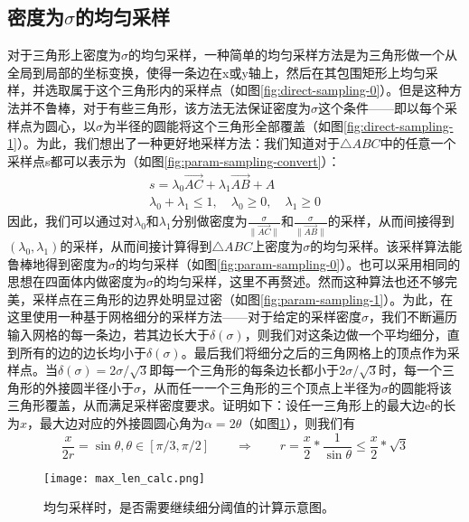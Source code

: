 \subsection{密度为$\sigma$的均匀采样}
对于三角形上密度为$\sigma$的均匀采样，一种简单的均匀采样方法是为三角形做一个从全局到局部的坐标变换，使得一条边在x或y轴上，然后在其包围矩形上均匀采样，并选取属于这个三角形内的采样点（如图\ref{fig:direct-sampling-0}）。但是这种方法并不鲁棒，对于有些三角形，该方法无法保证密度为$\sigma$这个条件——即以每个采样点为圆心，以$\sigma$为半径的圆能将这个三角形全部覆盖（如图\ref{fig:direct-sampling-1}）。为此，我们想出了一种更好地采样方法：我们知道对于$\triangle ABC$中的任意一个采样点s都可以表示为（如图\ref{fig:param-sampling-convert}）：
\begin{equation}
  \begin{split}
    s = \lambda_0 \overrightarrow{AC}+\lambda_1 \overrightarrow{AB} + A\\
    \lambda_0 + \lambda_1 \leq 1, \quad \lambda_0 \geq 0, \quad \lambda_1 \geq 0
  \end{split}
\end{equation}
因此，我们可以通过对$\lambda_0$和$\lambda_1$分别做密度为$\frac{\sigma}{\parallel \overrightarrow{AC} \parallel}$和$\frac{\sigma}{\parallel \overrightarrow{AB} \parallel}$的采样，从而间接得到$(\lambda_0,\lambda_1)$的采样，从而间接计算得到$\triangle ABC$上密度为$\sigma$的均匀采样。该采样算法能鲁棒地得到密度为$\sigma$的均匀采样（如图\ref{fig:param-sampling-0}）。也可以采用相同的思想在四面体内做密度为$\sigma$的均匀采样，这里不再赘述。然而这种算法也还不够完美，采样点在三角形的边界处明显过密（如图\ref{fig:param-sampling-1}）。为此，在这里使用一种基于网格细分的采样方法——对于给定的采样密度$\sigma$，我们不断遍历输入网格的每一条边，若其边长大于$\delta(\sigma)$，则我们对这条边做一个平均细分，直到所有的边的边长均小于$\delta(\sigma)$。最后我们将细分之后的三角网格上的顶点作为采样点。当$\delta(\sigma)=2\sigma/\sqrt{3}$即每一个三角形的每条边长都小于$2\sigma/\sqrt{3}$时，每一个三角形的外接圆半径小于$\sigma$，从而任一一个三角形的三个顶点上半径为$\sigma$的圆能将该三角形覆盖，从而满足采样密度要求。证明如下：设任一三角形上的最大边e的长为$x$，最大边对应的外接圆圆心角为$\alpha = 2\theta$（如图\ref{fig:max-len-calc}），则我们有
\begin{equation}
  \frac{x}{2r} = \sin\theta, \theta \in [\pi/3, \pi/2] \qquad
  \Rightarrow \qquad r =\frac{x}{2} * \frac{1}{\sin \theta} \leq \frac{x}{2} * \sqrt{3}
\end{equation}

\begin{figure}[htbp]
  \centering
  \texttt{[image: max\_len\_calc.png]}
  \caption[均匀采样细分阈值]{均匀采样时，是否需要继续细分阈值的计算示意图。}
  \label{fig:max-len-calc}
\end{figure}

